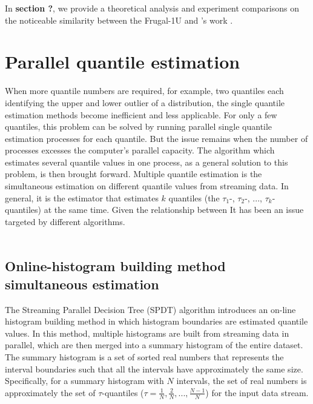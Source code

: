 \documentclass[12pt]{article}
\begin{document}
    In \textbf{section ?}, we provide a theoretical analysis and experiment comparisons on the noticeable similarity between the Frugal-1U and \citeauthor{yazidiQuantileEstimationDynamic2016}'s work . 

    
    \pagebreak 
    \section{Parallel quantile estimation}
    When more quantile numbers are required, for example, two quantiles each identifying the upper and lower outlier of a distribution, the single quantile estimation methods become inefficient and less applicable.
    For only a few quantiles, this problem can be solved by running parallel single quantile estimation processes for each quantile. But the issue remains when the number of processes excesses the computer's parallel capacity.
    The algorithm which estimates several quantile values in one process, as a general solution to this problem, is then brought forward.
    Multiple quantile estimation is the simultaneous estimation on different quantile values from streaming data. 
    In general, it is the estimator that estimates $k$ quantiles (the $\tau_1$-, $\tau_2$-, $...$, $\tau_k$-quantiles) at the same time.
    Given the relationship between 
    It has been an issue targeted by different algorithms.\\\\

    \subsection{Online-histogram building method simultaneous estimation\cite{ben-haimStreamingParallelDecision}}
    The Streaming Parallel Decision Tree (SPDT) algorithm \cite{ben-haimStreamingParallelDecision} introduces an on-line histogram building method %
    in which histogram boundaries are estimated quantile values.
    In this method, multiple histograms are built from streaming data in parallel, which are then merged into a summary histogram of the entire dataset. The summary histogram is a set of sorted real numbers that represents the interval boundaries such that all the intervals have approximately the same size. Specifically, for a summary histogram with $N$ intervals, the set of real numbers is approximately the set of $\tau$-quantiles ($\tau = \frac{1}{N}, \frac{2}{N}, ..., \frac{N-1}{N}$) for the input data stream.
\end{document}
